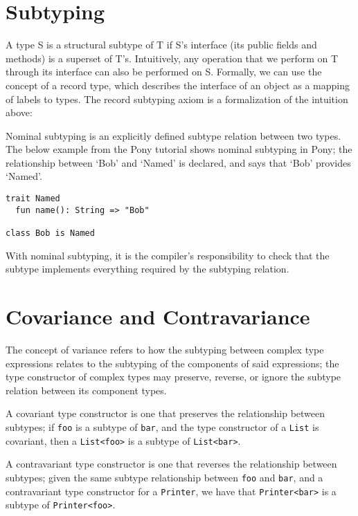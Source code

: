 \section{Subtyping}

A type S is a structural subtype of T if S’s interface (its public fields and methods) is a superset of T’s. Intuitively, any operation that we perform on T through its interface can also be performed on S.
Formally, we can use the concept of a record type, which describes the interface of an object as a mapping of labels to types. The record subtyping axiom is a formalization of the intuition above:

\begin{mathpar}
\end{mathpar}

Nominal subtyping is an explicitly defined subtype relation between two types. The below example from the Pony tutorial shows nominal subtyping in Pony; the relationship between ‘Bob’ and ‘Named’ is declared, and says that ‘Bob’ provides ‘Named’.
\begin{verbatim}
trait Named
  fun name(): String => "Bob"

class Bob is Named
\end{verbatim}
With nominal subtyping, it is the compiler’s responsibility to check that the subtype implements everything required by the subtyping relation.

\section{Covariance and Contravariance}

The concept of variance refers to how the subtyping between complex type expressions relates to the subtyping of the components of said expressions; the type constructor of complex types may preserve, reverse, or ignore the subtype relation between its component types.

A covariant type constructor is one that preserves the relationship between subtypes; if \texttt{foo} is a subtype of \texttt{bar}, and the type constructor of a \texttt{List} is covariant, then a \texttt{List<foo>} is a subtype of \texttt{List<bar>}.

A contravariant type constructor is one that reverses the relationship between subtypes; given the same subtype relationship between \texttt{foo} and \texttt{bar}, and a contravariant type constructor for a \texttt{Printer}, we have that \texttt{Printer<bar>} is a subtype of \texttt{Printer<foo>}.

